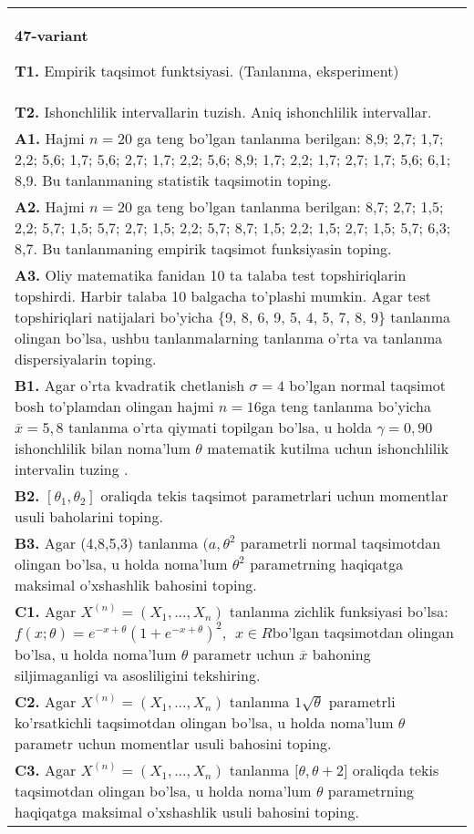 \documentclass{article}
\begin{document}
\begin{tabular}{m{17cm}}
\textbf{47-variant}
\newline

\textbf{T1.} 
Empirik taqsimot funktsiyasi. (Tanlanma, eksperiment)
\\
\textbf{T2.} 
Ishonchlilik intervallarin tuzish. Aniq ishonchlilik intervallar.
\\
\textbf{A1.} 
Hajmi \(n = 20\) ga teng bo'lgan tanlanma berilgan: 8,9; 2,7; 1,7; 2,2; 5,6; 1,7; 5,6; 2,7; 1,7; 2,2; 5,6; 8,9; 1,7; 2,2; 1,7; 2,7; 1,7; 5,6; 6,1; 8,9. Bu tanlanmaning statistik taqsimotin toping.
\\
\textbf{A2.} 
Hajmi \(n = 20\) ga teng bo'lgan tanlanma berilgan: 8,7; 2,7; 1,5; 2,2; 5,7; 1,5; 5,7; 2,7; 1,5; 2,2; 5,7; 8,7; 1,5; 2,2; 1,5; 2,7; 1,5; 5,7; 6,3; 8,7. Bu tanlanmaning empirik taqsimot funksiyasin toping.
\\
\textbf{A3.} 
Oliy matematika fanidan 10 ta talaba test topshiriqlarin topshirdi. Harbir talaba 10 balgacha to'plashi mumkin. Agar test topshiriqlari natijalari bo'yicha \{9, 8, 6, 9, 5, 4, 5, 7, 8, 9\} tanlanma olingan bo'lsa, ushbu tanlanmalarning tanlanma o'rta va tanlanma dispersiyalarin toping.
\\
\textbf{B1.} 
Agar o'rta kvadratik chetlanish \(\sigma = 4\) bo'lgan normal taqsimot bosh to'plamdan olingan hajmi \(n = 16\)ga teng tanlanma bo'yicha \(\overline{x} = 5,8\) tanlanma o'rta qiymati topilgan bo'lsa, u holda \(\gamma = 0,90\) ishonchlilik bilan noma'lum \(\theta\) matematik kutilma uchun ishonchlilik intervalin tuzing .
\\
\textbf{B2.} 
\(\left\lbrack \theta_{1},\theta_{2} \right\rbrack\) oraliqda tekis taqsimot parametrlari uchun momentlar usuli baholarini toping.
\\
\textbf{B3.} 
Agar (4,8,5,3) tanlanma \((a,\theta^{2}\) parametrli normal taqsimotdan olingan bo'lsa, u holda noma'lum \(\theta^{2}\) parametrning haqiqatga maksimal o'xshashlik bahosini toping.
\\
\textbf{C1.} 
Agar \(X^{(n)} = \left( X_{1},...,X_{n} \right)\) tanlanma zichlik funksiyasi bo'lsa: \(f(x;\theta) = e^{- x + \theta}\left( 1 + e^{- x + \theta} \right)^{2},\ \ x \in R\)bo'lgan taqsimotdan olingan bo'lsa, u holda noma'lum \(\theta\) parametr uchun \(\overline{x}\) bahoning siljimaganligi va asosliligini tekshiring.
\\
\textbf{C2.} 
Agar \(X^{(n)} = \left( X_{1},...,X_{n} \right)\) tanlanma \(1\sqrt{\theta}\) parametrli ko'rsatkichli taqsimotdan olingan bo'lsa, u holda noma'lum \(\theta\) parametr uchun momentlar usuli bahosini toping.
\\
\textbf{C3.} 
Agar \(X^{(n)} = \left( X_{1},...,X_{n} \right)\) tanlanma \(\lbrack\theta,\theta + 2\rbrack\) oraliqda tekis taqsimotdan olingan bo'lsa, u holda noma'lum \(\theta\) parametrning haqiqatga maksimal o'xshashlik usuli bahosini toping.
\\

\end{tabular}
\vspace{1cm}
\end{document}
